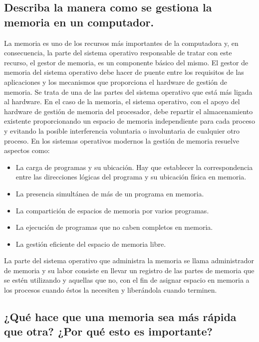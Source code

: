 \documentclass{article}
\begin{document}
\subsection{Describa la manera como se gestiona la memoria en un computador.}
La memoria es uno de los recursos más importantes de la computadora y, en consecuencia, la parte del sistema operativo responsable de tratar con este recurso, el gestor de memoria, es un componente básico del mismo. El gestor de memoria del sistema operativo debe hacer de puente entre los requisitos de las aplicaciones y los mecanismos que proporciona el hardware de gestión de memoria. Se trata de una de las partes del sistema operativo que está más
ligada al hardware.
En el caso de la memoria, el sistema operativo, con el apoyo del hardware de gestión de
memoria del procesador, debe repartir el almacenamiento existente proporcionando un espacio
de memoria independiente para cada proceso y evitando la posible interferencia voluntaria o involuntaria de cualquier otro proceso\cite{gm}.\newline
 En los sistemas operativos modernos la
gestión de memoria resuelve aspectos como:
\begin{itemize}
    \item {La carga de programas y su ubicación. Hay que establecer la correspondencia
entre las direcciones lógicas del programa y su ubicación física en memoria.}
\item{ La presencia simultánea de más de un programa en memoria.}

\item{ La compartición de espacios de memoria por varios programas.}

\item{ La ejecución de programas que no caben completos en memoria.}
\item{ La gestión eficiente del espacio de memoria libre}\cite{gestion}.
\end{itemize}
La parte del sistema operativo que administra la memoria se llama administrador de memoria y su labor consiste en llevar un registro de las partes de memoria que se estén utilizando y aquellas que no, con el fin de asignar espacio en memoria a los procesos cuando éstos la necesiten y liberándola cuando terminen\cite{gestionm}.







\subsection{¿Qué hace que una memoria sea más rápida que otra? ¿Por qué esto es importante?}
\end{document}
